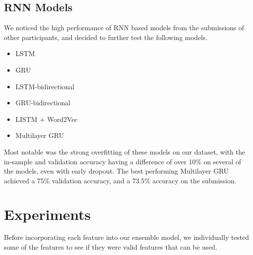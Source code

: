 \documentclass[a4paper, 12pt]{article}
\begin{document}
\begin{multicols}{2}
        \subsection{RNN Models}
            We noticed the high performance of RNN based models from the submissions of other participants, and decided to further test the following models.
            
            \begin{itemize}
                \item LSTM
                \item GRU
                \item LSTM-bidirectional
                \item GRU-bidirectional
                \item LISTM + Word2Vec
                \item Multilayer GRU
            \end{itemize}

            Most notable was the strong overfitting of these models on our dataset, with the in-sample and validation accuracy having a difference of over 10\% on several of the models, even with early dropout. The best performing Multilayer GRU achieved a 75\% validation accuracy, and a 73.5\% accuracy on the submission. 
            
    \section{Experiments}
        Before incorporating each feature into our ensemble model, we individually tested some of the features to see if they were valid features that can be used.

\end{multicols}
\end{document}
